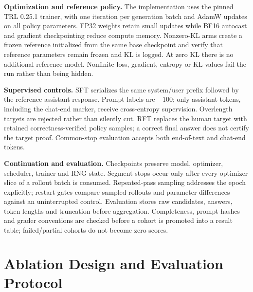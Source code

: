 \textbf{Optimization and reference policy.} The implementation uses the pinned TRL 0.25.1 trainer, with one iteration per generation batch and AdamW updates on all policy parameters. FP32 weights retain small updates while BF16 autocast and gradient checkpointing reduce compute memory. Nonzero-KL arms create a frozen reference initialized from the same base checkpoint and verify that reference parameters remain frozen and KL is logged. At zero KL there is no additional reference model. Nonfinite loss, gradient, entropy or KL values fail the run rather than being hidden.

\textbf{Supervised controls.} SFT serializes the same system/user prefix followed by the reference assistant response. Prompt labels are $-100$; only assistant tokens, including the chat-end marker, receive cross-entropy supervision. Overlength targets are rejected rather than silently cut. RFT replaces the human target with retained correctness-verified policy samples; a correct final answer does not certify the target proof. Common-stop evaluation accepts both end-of-text and chat-end tokens.

\textbf{Continuation and evaluation.} Checkpoints preserve model, optimizer, scheduler, trainer and RNG state. Segment stops occur only after every optimizer slice of a rollout batch is consumed. Repeated-pass sampling addresses the epoch explicitly; restart gates compare sampled rollouts and parameter differences against an uninterrupted control. Evaluation stores raw candidates, answers, token lengths and truncation before aggregation. Completeness, prompt hashes and grader conventions are checked before a cohort is promoted into a result table; failed/partial cohorts do not become zero scores.

\clearpage

\section{Ablation Design and Evaluation Protocol}

